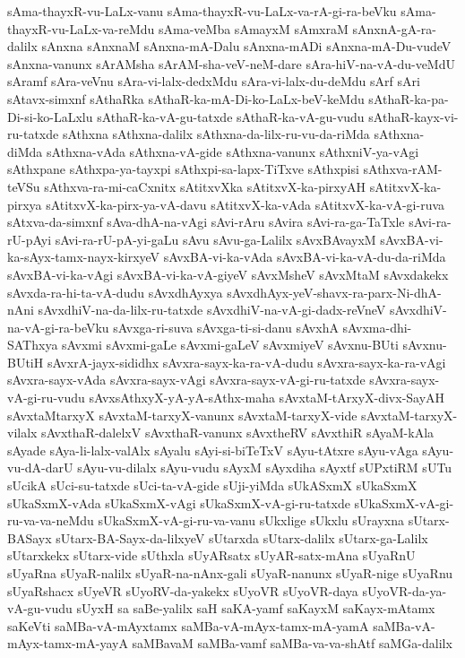 {sAma-thayxR-vu-LaLx-vanu
sAma-thayxR-vu-LaLx-va-rA-gi-ra-beVku
sAma-thayxR-vu-LaLx-va-reMdu
sAma-veMba
sAmayxM
sAmxraM
sAnxnA-gA-ra-dalilx
sAnxna
sAnxnaM
sAnxna-mA-Dalu
sAnxna-mADi
sAnxna-mA-Du-vudeV
sAnxna-vanunx
sArAMsha
sArAM-sha-veV-neM-dare
sAra-hiV-na-vA-du-veMdU
sAramf
sAra-veVnu
sAra-vi-lalx-dedxMdu
sAra-vi-lalx-du-deMdu
sArf
sAri
sAtavx-simxnf
sAthaRka
sAthaR-ka-mA-Di-ko-LaLx-beV-keMdu
sAthaR-ka-pa-Di-si-ko-LaLxlu
sAthaR-ka-vA-gu-tatxde
sAthaR-ka-vA-gu-vudu
sAthaR-kayx-vi-ru-tatxde
sAthxna
sAthxna-dalilx
sAthxna-da-lilx-ru-vu-da-riMda
sAthxna-diMda
sAthxna-vAda
sAthxna-vA-gide
sAthxna-vanunx
sAthxniV-ya-vAgi
sAthxpane
sAthxpa-ya-tayxpi
sAthxpi-sa-lapx-TiTxve
sAthxpisi
sAthxva-rAM-teVSu
sAthxva-ra-mi-caCxnitx
sAtitxvXka
sAtitxvX-ka-pirxyAH
sAtitxvX-ka-pirxya
sAtitxvX-ka-pirx-ya-vA-davu
sAtitxvX-ka-vAda
sAtitxvX-ka-vA-gi-ruva
sAtxva-da-simxnf
sAva-dhA-na-vAgi
sAvi-rAru
sAvira
sAvi-ra-ga-TaTxle
sAvi-ra-rU-pAyi
sAvi-ra-rU-pA-yi-gaLu
sAvu
sAvu-ga-Lalilx
sAvxBAvayxM
sAvxBA-vi-ka-sAyx-tamx-nayx-kirxyeV
sAvxBA-vi-ka-vAda
sAvxBA-vi-ka-vA-du-da-riMda
sAvxBA-vi-ka-vAgi
sAvxBA-vi-ka-vA-giyeV
sAvxMsheV
sAvxMtaM
sAvxdakekx
sAvxda-ra-hi-ta-vA-dudu
sAvxdhAyxya
sAvxdhAyx-yeV-shavx-ra-parx-Ni-dhA-nAni
sAvxdhiV-na-da-lilx-ru-tatxde
sAvxdhiV-na-vA-gi-dadx-reVneV
sAvxdhiV-na-vA-gi-ra-beVku
sAvxga-ri-suva
sAvxga-ti-si-danu
sAvxhA
sAvxma-dhi-SAThxya
sAvxmi
sAvxmi-gaLe
sAvxmi-gaLeV
sAvxmiyeV
sAvxnu-BUti
sAvxnu-BUtiH
sAvxrA-jayx-sididhx
sAvxra-sayx-ka-ra-vA-dudu
sAvxra-sayx-ka-ra-vAgi
sAvxra-sayx-vAda
sAvxra-sayx-vAgi
sAvxra-sayx-vA-gi-ru-tatxde
sAvxra-sayx-vA-gi-ru-vudu
sAvxsAthxyX-yA-yA-sAthx-maha
sAvxtaM-tArxyX-divx-SayAH
sAvxtaMtarxyX
sAvxtaM-tarxyX-vanunx
sAvxtaM-tarxyX-vide
sAvxtaM-tarxyX-vilalx
sAvxthaR-dalelxV
sAvxthaR-vanunx
sAvxtheRV
sAvxthiR
sAyaM-kAla
sAyade
sAya-li-lalx-valAlx
sAyalu
sAyi-si-biTeTxV
sAyu-tAtxre
sAyu-vAga
sAyu-vu-dA-darU
sAyu-vu-dilalx
sAyu-vudu
sAyxM
sAyxdiha
sAyxtf
sUPxtiRM
sUTu
sUcikA
sUci-su-tatxde
sUci-ta-vA-gide
sUji-yiMda
sUkASxmX
sUkaSxmX
sUkaSxmX-vAda
sUkaSxmX-vAgi
sUkaSxmX-vA-gi-ru-tatxde
sUkaSxmX-vA-gi-ru-va-va-neMdu
sUkaSxmX-vA-gi-ru-va-vanu
sUkxlige
sUkxlu
sUrayxna
sUtarx-BASayx
sUtarx-BA-Sayx-da-lilxyeV
sUtarxda
sUtarx-dalilx
sUtarx-ga-Lalilx
sUtarxkekx
sUtarx-vide
sUthxla
sUyARsatx
sUyAR-satx-mAna
sUyaRnU
sUyaRna
sUyaR-nalilx
sUyaR-na-nAnx-gali
sUyaR-nanunx
sUyaR-nige
sUyaRnu
sUyaRshacx
sUyeVR
sUyoRV-da-yakekx
sUyoVR
sUyoVR-daya
sUyoVR-da-ya-vA-gu-vudu
sUyxH
sa
saBe-yalilx
saH
saKA-yamf
saKayxM
saKayx-mAtamx
saKeVti
saMBa-vA-mAyxtamx
saMBa-vA-mAyx-tamx-mA-yamA
saMBa-vA-mAyx-tamx-mA-yayA
saMBavaM
saMBa-vamf
saMBa-va-va-shAtf
saMGa-dalilx
}
